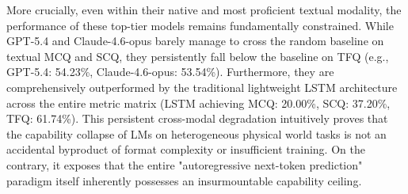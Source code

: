 More crucially, even within their native and most proficient textual modality, the performance of these top-tier models remains fundamentally constrained. While GPT-5.4 and Claude-4.6-opus barely manage to cross the random baseline on textual MCQ and SCQ, they persistently fall below the baseline on TFQ (e.g., GPT-5.4: 54.23\%, Claude-4.6-opus: 53.54\%). Furthermore, they are comprehensively outperformed by the traditional lightweight LSTM architecture across the entire metric matrix (LSTM achieving MCQ: 20.00\%, SCQ: 37.20\%, TFQ: 61.74\%). This persistent cross-modal degradation intuitively proves that the capability collapse of LMs on heterogeneous physical world tasks is not an accidental byproduct of format complexity or insufficient training. On the contrary, it exposes that the entire "autoregressive next-token prediction" paradigm itself inherently possesses an insurmountable capability ceiling.











